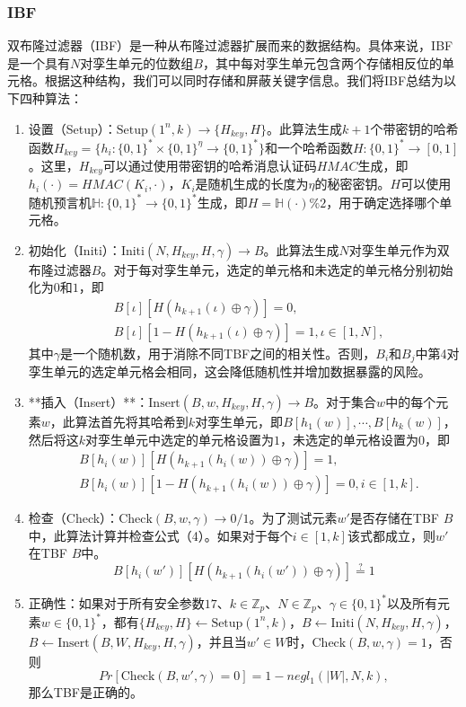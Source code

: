 \documentclass{cumcmthesis}
\numberwithin{equation}{section} %
\numberwithin{figure}{section} %
\numberwithin{table}{section} %
\begin{document}
\subsubsection{IBF}

双布隆过滤器（IBF）是一种从布隆过滤器扩展而来的数据结构。具体来说，IBF是一个具有$N$对孪生单元的位数组$B$，其中每对孪生单元包含两个存储相反位的单元格。根据这种结构，我们可以同时存储和屏蔽关键字信息。我们将IBF总结为以下四种算法：
\begin{enumerate}
    \item 设置（Setup）：$\text{Setup}(1^{n}, k) \to \{H_{key }, H\}$。此算法生成$k + 1$个带密钥的哈希函数$H_{key }=\{h_{i}:\{0,1\}^{*} \times \{0,1\}^{\eta} \to \{0,1\}^{*}\}$和一个哈希函数$H:\{0,1\}^{*} \to [0,1]$。这里，$H_{key }$可以通过使用带密钥的哈希消息认证码$HMAC$生成，即$h_{i}(\cdot)=HMAC(K_{i}, \cdot)$，$K_{i}$是随机生成的长度为$\eta$的秘密密钥。$H$可以使用随机预言机$\mathbb{H}:\{0,1\}^{*} \to \{0,1\}^{*}$生成，即$H = \mathbb{H}(\cdot)\%2$，用于确定选择哪个单元格。
    \item 初始化（Initi）：$\text{Initi}(N, H_{k e y}, H, \gamma) \to B$。此算法生成$N$对孪生单元作为双布隆过滤器$B$。对于每对孪生单元，选定的单元格和未选定的单元格分别初始化为$0$和$1$，即
    \begin{align*} 
    &B[\iota][H(h_{k + 1}(\iota)\oplus \gamma)] = 0, \\ 
    &B[\iota][1 - H(h_{k + 1}(\iota)\oplus \gamma)] = 1, \iota \in[1, N], 
    \end{align*}
    其中$\gamma$是一个随机数，用于消除不同TBF之间的相关性。否则，$B_{i}$和$B_{j}$中第4对孪生单元的选定单元格会相同，这会降低随机性并增加数据暴露的风险。
    \item **插入（Insert）**：$\text{Insert}(B, w, H_{k e y}, H, \gamma) \to B$。对于集合$w$中的每个元素$w$，此算法首先将其哈希到$k$对孪生单元，即$B[h_{1}(w)], \cdots, B[h_{k}(w)]$，然后将这$k$对孪生单元中选定的单元格设置为$1$，未选定的单元格设置为$0$，即
    \begin{align*} 
    &B[h_{i}(w)][H(h_{k + 1}(h_{i}(w))\oplus \gamma)] = 1, \\ 
    &B[h_{i}(w)][1 - H(h_{k + 1}(h_{i}(w))\oplus \gamma)] = 0, i \in[1, k]. 
    \end{align*}
    \item 检查（Check）：$\text{Check}(B, w, \gamma) \to 0/1$。为了测试元素$w'$是否存储在TBF $B$中，此算法计算并检查公式（4）。如果对于每个$i \in[1, k]$该式都成立，则$w'$在TBF $B$中。
    \[B[h_{i}(w')][H(h_{k + 1}(h_{i}(w'))\oplus \gamma)] \stackrel{?}{=} 1\]
    \item 正确性：如果对于所有安全参数$17$、$k \in \mathbb{Z}_{p}$、$N \in \mathbb{Z}_{p}$、$\gamma \in\{0,1\}^{*}$以及所有元素$w \in\{0,1\}^{*}$，都有$\{H_{k e y}, H\} \leftarrow \text{Setup}(1^{n}, k)$，$B \leftarrow \text{Initi}(N, H_{key }, H, \gamma)$，$B \leftarrow \text{Insert}(B, W, H_{k e y}, H, \gamma)$，并且当$w' \in W$时，$\text{Check}(B, w, \gamma)=1$，否则
    \[Pr[\text{Check}(B, w', \gamma)=0]=1 - negl_{1}(|W|, N, k),\]
    那么TBF是正确的。
\end{enumerate}
\end{document}
